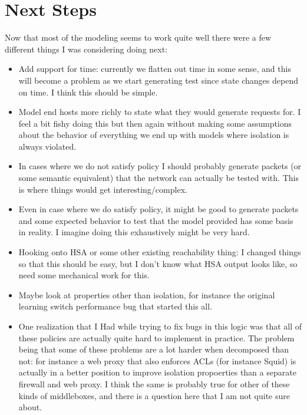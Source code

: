 \documentclass[11pt]{article}
\begin{document}
\section{Next Steps}
Now that most of the modeling seems to work quite well there were a few different things I was considering doing next:
\begin{itemize}
\item Add support for time: currently we flatten out time in some sense, and this will become a problem as we start generating 
test since state changes depend on time. I think this should be simple.
\item Model end hosts more richly to state what they would generate requests for. I feel a bit fishy doing this but then again without making
    some assumptions about the behavior of everything we end up with models where isolation is always violated.
\item In cases where we do not satisfy policy I should probably generate packets (or some semantic equivalent) that the network can
actually be tested with. This is where things would get interesting/complex.
\item Even in case where we do satisfy policy, it might be good to generate packets and some expected behavior to test that the model
provided has some basis in reality. I imagine doing this exhaustively might be very hard.
\item Hooking onto HSA or some other existing reachability thing: I changed things so that this should be easy, but I don't know what HSA output
    looks like, so need some mechanical work for this.
\item Maybe look at properties other than isolation, for instance the original learning switch performance bug that started this all.
\item One realization that I Had while trying to fix bugs in this logic was that all of these policies are actually quite hard to implement in practice. The
problem being that some of these problems are a lot harder when decomposed than not: for instance a web proxy that also enforces ACLs (for instance Squid) is 
actually in a better position to improve isolation propoerties than a separate firewall and web proxy. I think the same is probably true for other of these kinds
of middleboxes, and there is a question here that I am not quite sure about.
\end{itemize} 

\end{document}
